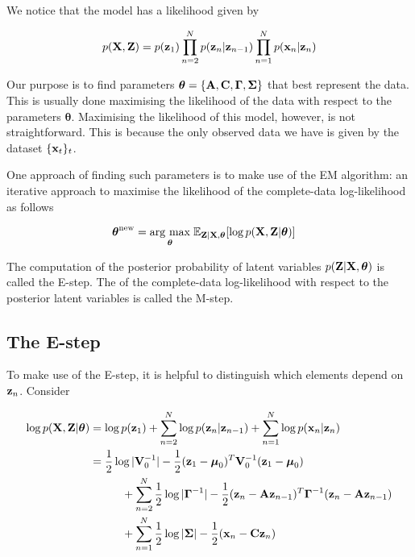 \documentclass[11pt]{article}
\newcommand{\argmax}[1]{\underset{#1}{\operatorname{arg}\,\operatorname{max}}\;}
\begin{document}
We notice that the model has a likelihood given by

\begin{equation}
	p({\bf X}, {\bf Z}) = p({\bf z}_1)\prod_{n=2}^N p({\bf z}_n\vert {\bf z}_{n-1})\prod_{n=1}^N p({\bf x}_n\vert {\bf z}_n)
\end{equation}

Our purpose is to find parameters $\boldsymbol\theta = \{{\bf A}, {\bf C}, \boldsymbol\Gamma, \boldsymbol\Sigma\}$ that best represent the data. This is usually done maximising the likelihood of the data with respect to the parameters $\boldsymbol{\theta}$. Maximising the likelihood of this model, however, is not straightforward. This is because the only observed data we have is given by the dataset $\{{\bf x}_t\}_t$. 


One approach of finding such parameters is to make use of the EM algorithm: an iterative approach to maximise the likelihood of the complete-data log-likelihood as follows

\begin{align}
	\boldsymbol{\theta}^\text{new} &= \argmax{\boldsymbol{\theta}} \mathbb{E}_{{\bf Z}\vert {\bf X}, \boldsymbol{\theta}}[\log p({\bf X}, {\bf Z}\vert \boldsymbol\theta)]
\end{align}

The computation of the posterior probability of latent variables $p({\bf Z}\vert {\bf X}, \boldsymbol\theta)$ is called the E-step. The  of the complete-data log-likelihood with respect to the posterior latent variables is called the M-step.


\subsection{The E-step}
To make use of the E-step, it is helpful to distinguish which elements depend on ${\bf z}_n$. Consider

\begin{align}
	\log p({\bf X}, {\bf Z}\vert \boldsymbol\theta) &= \log p({\bf z}_1) + \sum_{n=2}^N \log p({\bf z}_n\vert {\bf z}_{n-1}) + \sum_{n=1}^N \log p({\bf x}_n\vert {\bf z}_n)\\
	   &=\frac{1}{2}\log\vert{\bf V}_0^{-1}\vert - \frac{1}{2}({\bf z}_1 - \boldsymbol\mu_0)^T{\bf V}_0^{-1}({\bf z}_1 - \boldsymbol\mu_0) \nonumber \\
	   &\hspace{1cm}+ \sum_{n=2}^N \frac{1}{2}\log\vert\boldsymbol\Gamma^{-1}\vert - \frac{1}{2}({\bf z}_n - {\bf A z}_{n-1})^T\boldsymbol{\Gamma}^{-1}({\bf z}_n - {\bf A z}_{n-1}) \nonumber \\
	   &\hspace{1cm}+\sum_{n=1}^N \frac{1}{2}\log\vert\boldsymbol\Sigma\vert -\frac{1}{2}({\bf x}_n - {\bf C z}_n)
\end{align}
\end{document}

